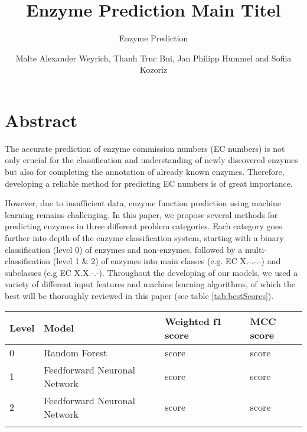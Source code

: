 \documentclass{bioinfo}
\begin{document}

\subtitle{Enzyme Prediction}

\title[]{Enzyme Prediction Main Titel}
\author[]{Malte Alexander Weyrich, Thanh Truc Bui, Jan Philipp Hummel
and  Sofiia Kozoriz}

\address{}
\corresp{}
\history{}
\editor{}


\maketitle


\section{Abstract}
The accurate prediction of enzyme commission numbers (EC numbers) is not only crucial for 
the classification and understanding of newly discovered enzymes but also for completing the annotation of already known enzymes.
Therefore, developing a reliable method for predicting EC numbers is of great importance.

However, due to insufficient data, enzyme function prediction using machine learning remains challenging.
In this paper, we propose several methods for predicting enzymes in three different problem categories. Each category goes further into depth
of the enzyme classification system, starting with a binary classification (level 0) of enzymes and non-enzymes, followed by a multi-classification (level 1 \& 2) of enzymes into main classes (e.g. EC X.-.-.-) and subclasses (e.g EC X.X.-.-).
Throughout the developing of our models, we used a variety of different input features and machine learning algorithms, of which the best will be thoroughly reviewed in this paper (see table \ref{tab:bestScores}).

\begin{table}[!htbp]
 {\begin{tabular}{@{}llll@{}}\toprule 
		Level &  Model & Weighted f1 score & MCC score\\\midrule
		0 & Random Forest & score & score\\
		1 &  Feedforward Neuronal Network & score & score \\
		2 &  Feedforward Neuronal Network & score & score\\\botrule
\end{tabular}}{}
\end{table}
\end{document}
